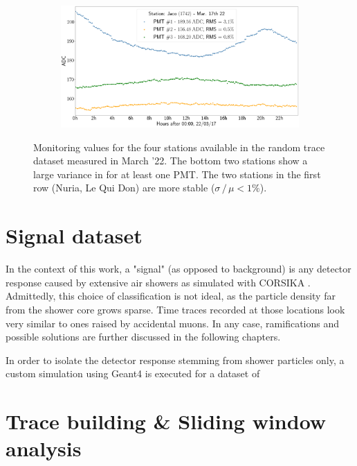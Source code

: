 \begin{landscape}
\begin{figure}
\begin{subfigure}[b]{0.5\textwidth}
        \end{subfigure}
        \begin{subfigure}[b]{0.5\textwidth}   
            \centering 
            \includegraphics[width=0.7\textheight]{./plots/random_trace_diagnostics_jaco.png}
        \end{subfigure}
        \caption{Monitoring values for the four stations available in the random trace dataset measured in March '22. The bottom two stations show a large variance
		in \Ipeak for at least one PMT. The two stations in the first row (Nuria, Le Qui Don) are more stable ($\sigma\,/\,\mu < 1\%$).} 
        \label{fig:random-trace-diagnostics}
    \end{figure}
\end{landscape}

\section{Signal dataset}
\label{sec:signal-dataset}

In the context of this work, a "signal" (as opposed to background) is any detector response caused by extensive air showers as simulated with CORSIKA 
\cite{heck1998corsika}. Admittedly, this choice of classification is not ideal, as the particle density far from the shower core grows sparse. Time traces recorded 
at those locations look very similar to ones raised by accidental muons. In any case, ramifications and possible solutions are further discussed in the following 
chapters. 

In order to isolate the detector response stemming from shower particles only, a custom \Offline simulation using Geant4 is executed for a dataset of 

\section{Trace building \& Sliding window analysis}
\label{sec:sliding-window-analysis}
